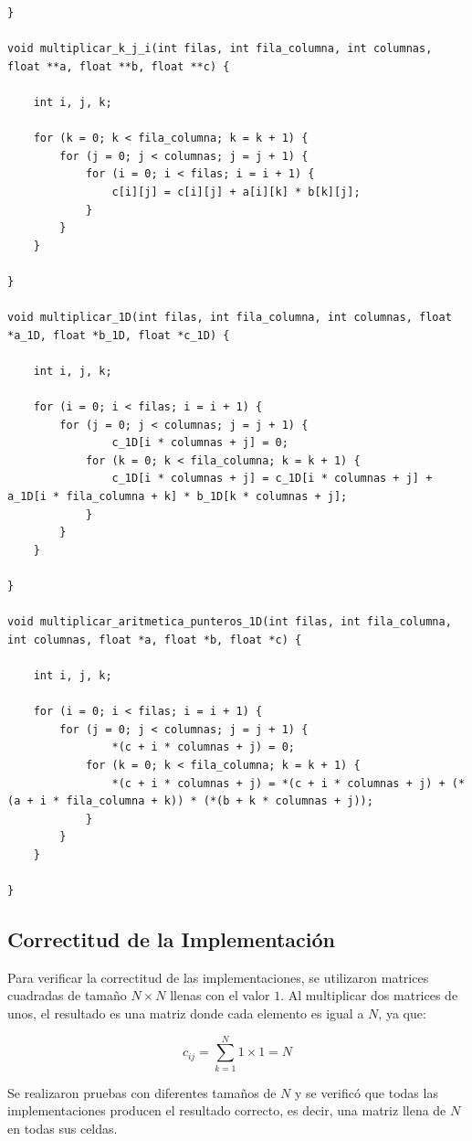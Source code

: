 \documentclass[10pt]{article}
\begin{document}
\begin{lstlisting}
}

void multiplicar_k_j_i(int filas, int fila_columna, int columnas, float **a, float **b, float **c) {

    int i, j, k;

    for (k = 0; k < fila_columna; k = k + 1) {
        for (j = 0; j < columnas; j = j + 1) {
            for (i = 0; i < filas; i = i + 1) {
                c[i][j] = c[i][j] + a[i][k] * b[k][j];
            }
        }
    }

}

void multiplicar_1D(int filas, int fila_columna, int columnas, float *a_1D, float *b_1D, float *c_1D) {

    int i, j, k;

    for (i = 0; i < filas; i = i + 1) {
        for (j = 0; j < columnas; j = j + 1) {
                c_1D[i * columnas + j] = 0; 
            for (k = 0; k < fila_columna; k = k + 1) {
                c_1D[i * columnas + j] = c_1D[i * columnas + j] + a_1D[i * fila_columna + k] * b_1D[k * columnas + j];
            }
        }
    }

}

void multiplicar_aritmetica_punteros_1D(int filas, int fila_columna, int columnas, float *a, float *b, float *c) {

    int i, j, k;

    for (i = 0; i < filas; i = i + 1) {
        for (j = 0; j < columnas; j = j + 1) {
                *(c + i * columnas + j) = 0; 
            for (k = 0; k < fila_columna; k = k + 1) {
                *(c + i * columnas + j) = *(c + i * columnas + j) + (*(a + i * fila_columna + k)) * (*(b + k * columnas + j));
            }
        }
    }

}
\end{lstlisting}

\subsection{Correctitud de la Implementación}

Para verificar la correctitud de las implementaciones, se utilizaron matrices cuadradas de tamaño $N \times N$ llenas con el valor $1$. Al multiplicar dos matrices de unos, el resultado es una matriz donde cada elemento es igual a $N$, ya que:

\[
c_{ij} = \sum_{k=1}^{N} 1 \times 1 = N
\]

Se realizaron pruebas con diferentes tamaños de $N$ y se verificó que todas las implementaciones producen el resultado correcto, es decir, una matriz llena de $N$ en todas sus celdas.
\end{document}

